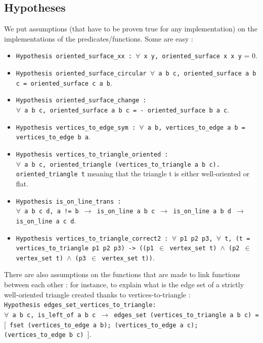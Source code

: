 \documentclass[a4paper,10pt]{article}
\begin{document}
  \subsection{Hypotheses}
\label{Hypothesis}
We put assumptions (that have to be proven true for any implementation) on the implementations of the predicates/functions. Some are easy :
\begin{itemize}
\item {\tt Hypothesis oriented\_surface\_xx :  $\forall$ x y, oriented\_surface x x y} = 0.
\item {\tt Hypothesis oriented\_surface\_circular $\forall$ a b c, oriented\_surface a b c = oriented\_surface c a b}.
\item {\tt Hypothesis oriented\_surface\_change : \\$\forall$ a b c, oriented\_surface a b c = - oriented\_surface b a c}.
\item {\tt Hypothesis vertices\_to\_edge\_sym :
    $\forall$ a b, vertices\_to\_edge a b = vertices\_to\_edge b a}.
  \item 
{\tt Hypothesis vertices\_to\_triangle\_oriented :\\
  $\forall$ a b c, oriented\_triangle (vertices\_to\_triangle a b c).}\\
{\tt oriented\_triangle t} meaning that the triangle t is either well-oriented or flat.
\item {\tt Hypothesis is\_on\_line\_trans :\\
  $\forall$ a b c d, a != b $\rightarrow$ is\_on\_line a b c $\rightarrow$ is\_on\_line a b d $\rightarrow$
  is\_on\_line a c d}.
\item {\tt Hypothesis vertices\_to\_triangle\_correct2 : $\forall$ p1 p2 p3, $\forall$ t,
          (t = vertices\_to\_triangle p1 p2 p3) ->
  ((p1 $\in$ vertex\_set t) $\wedge$ (p2 $\in$ vertex\_set t) $\wedge$ (p3 $\in$ vertex\_set t))}.

\end{itemize}
There are also assumptions on the functions that are made to link functions between each other : for instance, to explain what is the edge set of a strictly well-oriented triangle created thanks to vertices-to-triangle :\\
{\tt Hypothesis edges\_set\_vertices\_to\_triangle:\\ 
  $\forall$ a b c, is\_left\_of a b c $\rightarrow$
    edges\_set (vertices\_to\_triangle a b c) =\\ 
                       $[$ fset (vertices\_to\_edge a b);
                           (vertices\_to\_edge a c);
                           (vertices\_to\_edge b c) $]$}.
\end{document}
